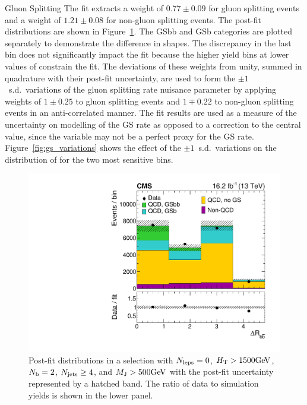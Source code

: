 \begin{section}{Gluon Splitting}
The \dRbb fit extracts a weight of $0.77 \pm 0.09$ for gluon splitting events and a weight of $1.21 \pm 0.08$ for non-gluon splitting events.
The post-fit distributions are shown in Figure~\ref{fig:gs_fitresult}.
The GSbb and GSb categories are plotted separately to demonstrate the difference in shapes.
The discrepancy in the last bin does not significantly impact the fit because the higher yield bins at lower values of \dRbb constrain the fit.
The deviations of these weights from unity, summed in quadrature with their post-fit uncertainty, are used to form the $\pm 1$~s.d.\ variations of the gluon splitting rate nuisance parameter by applying weights of $1 \pm 0.25$ to gluon splitting events and $1 \mp 0.22$ to non-gluon splitting events in an anti-correlated manner.
The fit results are used as a measure of the uncertainty on modelling of the GS rate as opposed to a correction to the central value, since the \dRbb  variable may not be a perfect proxy for the GS rate.
Figure~\ref{fig:gs_variations} shows the effect of the $\pm 1$~s.d.\ variations on the \Nb distribution of \ttbar for the two most sensitive bins.

\begin{figure}[tbp!]
\begin{center}
\includegraphics[angle=0,width=0.45\columnwidth]{fig/gs_fitresult.pdf}
\end{center}
\caption{Post-fit \dRbb distributions in a selection with  $N_{\mathrm{leps}} = 0$, $H_\mathrm{T} > 1500\mathrm{Ge\kern -0.1em V}$, $N_\mathrm{b} = 2$, $N_{\mathrm{jets}} \geq 4$, and $M_\mathrm{J}>500\mathrm{Ge\kern -0.1em V}$ with the post-fit uncertainty represented by a hatched band.
The ratio of data to simulation yields is shown in the lower panel.}
\label{fig:gs_fitresult}
\end{figure}


\end{section}
